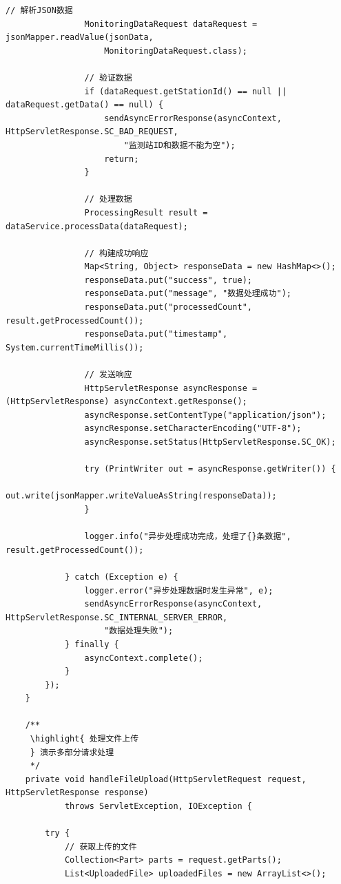 \begin{lstlisting}[style=java]
                // 解析JSON数据
                MonitoringDataRequest dataRequest = jsonMapper.readValue(jsonData, 
                    MonitoringDataRequest.class);
                
                // 验证数据
                if (dataRequest.getStationId() == null || dataRequest.getData() == null) {
                    sendAsyncErrorResponse(asyncContext, HttpServletResponse.SC_BAD_REQUEST, 
                        "监测站ID和数据不能为空");
                    return;
                }
                
                // 处理数据
                ProcessingResult result = dataService.processData(dataRequest);
                
                // 构建成功响应
                Map<String, Object> responseData = new HashMap<>();
                responseData.put("success", true);
                responseData.put("message", "数据处理成功");
                responseData.put("processedCount", result.getProcessedCount());
                responseData.put("timestamp", System.currentTimeMillis());
                
                // 发送响应
                HttpServletResponse asyncResponse = (HttpServletResponse) asyncContext.getResponse();
                asyncResponse.setContentType("application/json");
                asyncResponse.setCharacterEncoding("UTF-8");
                asyncResponse.setStatus(HttpServletResponse.SC_OK);
                
                try (PrintWriter out = asyncResponse.getWriter()) {
                    out.write(jsonMapper.writeValueAsString(responseData));
                }
                
                logger.info("异步处理成功完成，处理了{}条数据", result.getProcessedCount());
                
            } catch (Exception e) {
                logger.error("异步处理数据时发生异常", e);
                sendAsyncErrorResponse(asyncContext, HttpServletResponse.SC_INTERNAL_SERVER_ERROR, 
                    "数据处理失败");
            } finally {
                asyncContext.complete();
            }
        });
    }
    
    /**
     \highlight{ 处理文件上传
     } 演示多部分请求处理
     */
    private void handleFileUpload(HttpServletRequest request, HttpServletResponse response) 
            throws ServletException, IOException {
        
        try {
            // 获取上传的文件
            Collection<Part> parts = request.getParts();
            List<UploadedFile> uploadedFiles = new ArrayList<>();
            

\end{lstlisting}
